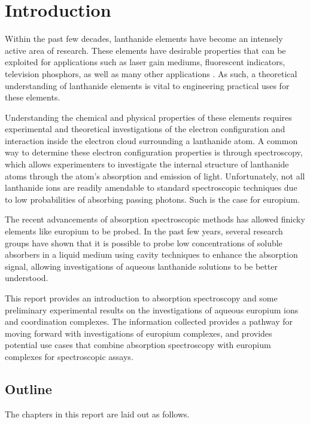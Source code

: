 \chapter*{Introduction}  \label{chap:intro}

Within the past few decades, lanthanide elements have become an intensely
active area of research. These elements have desirable properties that can be
exploited for applications such as laser gain mediums, fluorescent indicators,
television phosphors, as well as many other applications \cite{Bunzli:2005ic}.
As such, a theoretical understanding of lanthanide elements is vital to
engineering practical uses for these elements.

Understanding the chemical and physical properties of these elements requires
experimental and theoretical investigations of the electron configuration and
interaction inside the electron cloud surrounding a lanthanide atom. A common
way to determine these electron configuration properties is through
spectroscopy, which allows experimenters to investigate the internal structure
of lanthanide atoms through the atom's absorption and emission of light.
Unfortunately, not all lanthanide ions are readily amendable to standard
spectroscopic techniques due to low probabilities of absorbing passing
photons.  Such is the case for europium.

The recent advancements of absorption spectroscopic methods has allowed finicky
elements like europium to be probed. In the past few years, several research
groups have shown that it is possible to probe low concentrations of soluble
absorbers in a liquid medium using cavity techniques to enhance the absorption
signal, allowing investigations of aqueous lanthanide solutions to be better
understood.

This report provides an introduction to absorption spectroscopy and some
preliminary experimental results on the investigations of aqueous europium ions
and coordination complexes. The information collected provides a pathway for
moving forward with investigations of europium complexes, and provides
potential use cases that combine absorption spectroscopy with europium
complexes for spectroscopic assays.

\section*{Outline}

The chapters in this report are laid out as follows.

